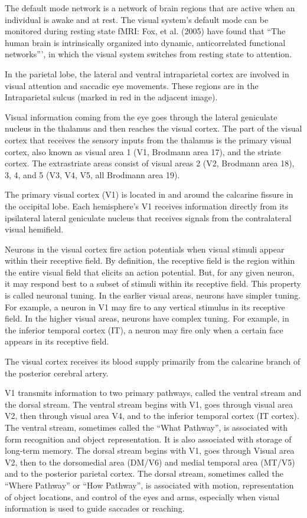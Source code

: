 The default mode network is a network of brain regions that are active when an individual is awake and at rest. The visual system's default mode can be monitored during resting state fMRI: Fox, et al. (2005) have found that ``The human brain is intrinsically organized into dynamic, anticorrelated functional networks''', in which the visual system switches from resting state to attention.

In the parietal lobe, the lateral and ventral intraparietal cortex are involved in visual attention and saccadic eye movements. These regions are in the Intraparietal sulcus (marked in red in the adjacent image).

Visual information coming from the eye goes through the lateral geniculate nucleus in the thalamus and then reaches the visual cortex. The part of the visual cortex that receives the sensory inputs from the thalamus is the primary visual cortex, also known as visual area 1 (V1, Brodmann area 17), and the striate cortex. The extrastriate areas consist of visual areas 2 (V2, Brodmann area 18), 3, 4, and 5 (V3, V4, V5, all Brodmann area 19).

The primary visual cortex (V1) is located in and around the calcarine fissure in the occipital lobe. Each hemisphere's V1 receives information directly from its ipsilateral lateral geniculate nucleus that receives signals from the contralateral visual hemifield.

Neurons in the visual cortex fire action potentials when visual stimuli appear within their receptive field. By definition, the receptive field is the region within the entire visual field that elicits an action potential. But, for any given neuron, it may respond best to a subset of stimuli within its receptive field. This property is called neuronal tuning. In the earlier visual areas, neurons have simpler tuning. For example, a neuron in V1 may fire to any vertical stimulus in its receptive field. In the higher visual areas, neurons have complex tuning. For example, in the inferior temporal cortex (IT), a neuron may fire only when a certain face appears in its receptive field.

The visual cortex receives its blood supply primarily from the calcarine branch of the posterior cerebral artery.

V1 transmits information to two primary pathways, called the ventral stream and the dorsal stream. The ventral stream begins with V1, goes through visual area V2, then through visual area V4, and to the inferior temporal cortex (IT cortex). The ventral stream, sometimes called the ``What Pathway'', is associated with form recognition and object representation. It is also associated with storage of long-term memory.
The dorsal stream begins with V1, goes through Visual area V2, then to the dorsomedial area (DM/V6) and medial temporal area (MT/V5) and to the posterior parietal cortex. The dorsal stream, sometimes called the ``Where Pathway'' or ``How Pathway'', is associated with motion, representation of object locations, and control of the eyes and arms, especially when visual information is used to guide saccades or reaching.

